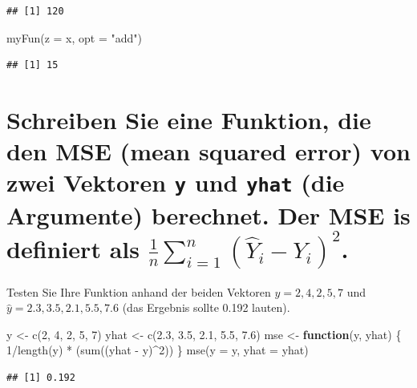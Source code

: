 \documentclass[12pt,a4paper]{article}
\newenvironment{Shaded}{\begin{snugshade}}{\end{snugshade}}
\newcommand{\AttributeTok}[1]{\textcolor[rgb]{0.77,0.63,0.00}{#1}}
\newcommand{\ControlFlowTok}[1]{\textcolor[rgb]{0.13,0.29,0.53}{\textbf{#1}}}
\newcommand{\DecValTok}[1]{\textcolor[rgb]{0.00,0.00,0.81}{#1}}
\newcommand{\FloatTok}[1]{\textcolor[rgb]{0.00,0.00,0.81}{#1}}
\newcommand{\FunctionTok}[1]{\textcolor[rgb]{0.00,0.00,0.00}{#1}}
\newcommand{\NormalTok}[1]{#1}
\newcommand{\OtherTok}[1]{\textcolor[rgb]{0.56,0.35,0.01}{#1}}
\newcommand{\SpecialCharTok}[1]{\textcolor[rgb]{0.00,0.00,0.00}{#1}}
\newcommand{\StringTok}[1]{\textcolor[rgb]{0.31,0.60,0.02}{#1}}
\begin{document}
\begin{verbatim}
## [1] 120
\end{verbatim}

\begin{Shaded}
\begin{Highlighting}[]
    \FunctionTok{myFun}\NormalTok{(}\AttributeTok{z =}\NormalTok{ x, }\AttributeTok{opt =} \StringTok{"add"}\NormalTok{)}
\end{Highlighting}
\end{Shaded}

\begin{verbatim}
## [1] 15
\end{verbatim}

\hypertarget{schreiben-sie-eine-funktion-die-den-mse-mean-squared-error-von-zwei-vektoren-y-und-yhat-die-argumente-berechnet.-der-mse-is-definiert-als-frac1nsum_i1n-haty_i---y_i2.}{%
\section{\texorpdfstring{Schreiben Sie eine Funktion, die den MSE (mean
squared error) von zwei Vektoren \texttt{y} und \texttt{yhat} (die
Argumente) berechnet. Der MSE is definiert als
\(\frac{1}{n}\sum_{i=1}^n (\hat{Y}_i - Y_i)^2\).}{Schreiben Sie eine Funktion, die den MSE (mean squared error) von zwei Vektoren y und yhat (die Argumente) berechnet. Der MSE is definiert als \textbackslash frac\{1\}\{n\}\textbackslash sum\_\{i=1\}\^{}n (\textbackslash hat\{Y\}\_i - Y\_i)\^{}2.}}\label{schreiben-sie-eine-funktion-die-den-mse-mean-squared-error-von-zwei-vektoren-y-und-yhat-die-argumente-berechnet.-der-mse-is-definiert-als-frac1nsum_i1n-haty_i---y_i2.}}

Testen Sie Ihre Funktion anhand der beiden Vektoren
\(y = {2, 4, 2, 5, 7}\) und \(\hat{y}= {2.3, 3.5, 2.1, 5.5, 7.6}\) (das
Ergebnis sollte 0.192 lauten).

\begin{Shaded}
\begin{Highlighting}[]
\NormalTok{    y    }\OtherTok{\textless{}{-}} \FunctionTok{c}\NormalTok{(}\DecValTok{2}\NormalTok{, }\DecValTok{4}\NormalTok{, }\DecValTok{2}\NormalTok{, }\DecValTok{5}\NormalTok{, }\DecValTok{7}\NormalTok{)}
\NormalTok{    yhat }\OtherTok{\textless{}{-}} \FunctionTok{c}\NormalTok{(}\FloatTok{2.3}\NormalTok{, }\FloatTok{3.5}\NormalTok{, }\FloatTok{2.1}\NormalTok{, }\FloatTok{5.5}\NormalTok{, }\FloatTok{7.6}\NormalTok{)}
\NormalTok{    mse }\OtherTok{\textless{}{-}} \ControlFlowTok{function}\NormalTok{(y, yhat) \{}
      \DecValTok{1}\SpecialCharTok{/}\FunctionTok{length}\NormalTok{(y) }\SpecialCharTok{*}\NormalTok{ (}\FunctionTok{sum}\NormalTok{((yhat }\SpecialCharTok{{-}}\NormalTok{ y)}\SpecialCharTok{\^{}}\DecValTok{2}\NormalTok{))}
\NormalTok{    \}}
    \FunctionTok{mse}\NormalTok{(}\AttributeTok{y =}\NormalTok{ y, }\AttributeTok{yhat =}\NormalTok{ yhat)}
\end{Highlighting}
\end{Shaded}

\begin{verbatim}
## [1] 0.192
\end{verbatim}
\end{document}
